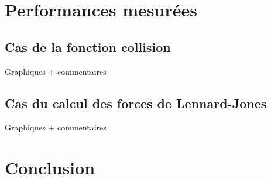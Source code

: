 \documentclass{article}
\begin{document}
\section{Performances mesurées}

\subsection{Cas de la fonction collision}
Graphiques + commentaires
\subsection{Cas du calcul des forces de Lennard-Jones}
Graphiques + commentaires

\section{Conclusion}
\end{document}
